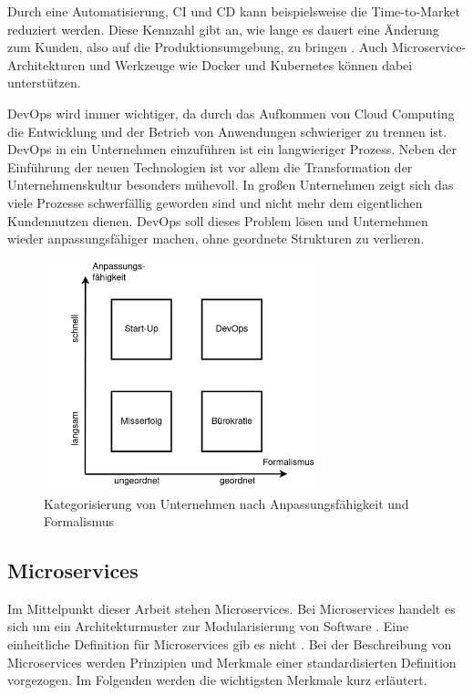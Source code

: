 Durch eine Automatisierung, \ac{CI} und \ac{CD} kann beispielsweise die Time-to-Market reduziert werden. Diese Kennzahl gibt an, wie lange es dauert eine Änderung zum Kunden, also auf die Produktionsumgebung, zu bringen \parencite[vgl.][S. 7]{halstenbergDevOps2020}. Auch Microservice-Architekturen und Werkzeuge wie Docker und Kubernetes können dabei unterstützen.

DevOps wird immer wichtiger, da durch das Aufkommen von Cloud Computing die Entwicklung und der Betrieb von Anwendungen schwieriger zu trennen ist. DevOps in ein Unternehmen einzuführen ist ein langwieriger Prozess. Neben der Einführung der neuen Technologien ist vor allem die Transformation der Unternehmenskultur besonders mühevoll. In großen Unternehmen zeigt sich das viele Prozesse schwerfällig geworden sind und nicht mehr dem eigentlichen Kundennutzen dienen. DevOps soll dieses Problem lösen und Unternehmen wieder anpassungsfähiger machen, ohne geordnete Strukturen zu verlieren.

\begin{figure}[H] 
    \centering
    \includegraphics[width=0.7\textwidth]{figures/DevOpsKategroisierung.png}
    \caption{Kategorisierung von Unternehmen nach Anpassungsfähigkeit und Formalismus \parencite[vgl.][S. 11]{halstenbergDevOps2020}}
\end{figure}

\subsection{Microservices}
Im Mittelpunkt dieser Arbeit stehen Microservices. Bei Microservices handelt es sich um ein Architekturmuster zur Modularisierung von Software \parencite[vgl.][S. 15]{newmanMicroservices2015}. Eine einheitliche Definition für Microservices gib es nicht \parencite[vgl.][S. 2]{wolffMicroservices2018}. Bei der Beschreibung von Microservices werden Prinzipien und Merkmale einer standardisierten Definition vorgezogen. Im Folgenden werden die wichtigsten Merkmale kurz erläutert.

